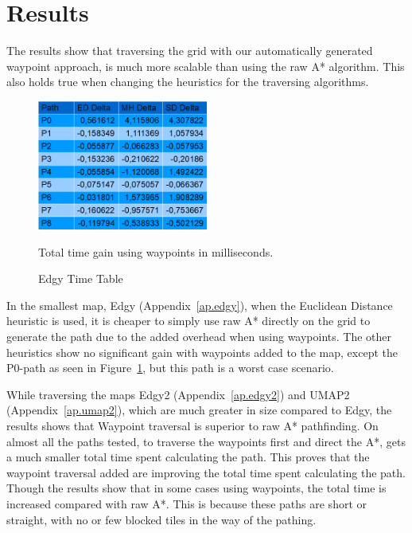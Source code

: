 \documentclass[a4paper]{article}
\begin{document}
{\section{Results}
The results show that traversing the grid with our automatically generated waypoint approach, is much more scalable than using the raw A* algorithm. This also holds true when changing the heuristics for the traversing algorithms.
\begin{figure}[h!]
\centering
\includegraphics[width=0.5\textwidth,height=\textheight,keepaspectratio]{ChartsAndFigures/Edgy_timeTable.png}
\caption{Edgy Time Table}
Total time gain using waypoints in milliseconds.
\label{fig:Edgy_cd}
\end{figure}
In the smallest map, Edgy (Appendix~\ref{ap.edgy}), when the Euclidean Distance heuristic is used, it is cheaper to simply use raw A* directly on the grid to generate the path due to the added overhead when using waypoints. The other heuristics show no significant gain with waypoints added to the map, except the P0-path as seen in Figure~\ref{fig:Edgy_cd}, but this path is a worst case scenario.
	
While traversing the maps Edgy2 (Appendix~\ref{ap.edgy2}) and UMAP2 (Appendix~\ref{ap.umap2}), which are much greater in size compared to Edgy, the results shows that Waypoint traversal is superior to raw A* pathfinding. On almost all the paths tested, to traverse the waypoints first and direct the A*, gets a much smaller total time spent calculating the path. This proves that the waypoint traversal added are improving the total time spent calculating the path. Though the results show that in some cases using waypoints, the total time is increased compared with raw A*. This is because these paths are short or straight, with no or few blocked tiles in the way of the pathing.
	
}
\end{document}
